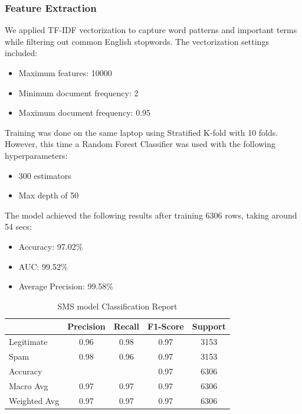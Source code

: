 \documentclass{article}
\begin{document}
\subsubsection*{Feature Extraction}

We applied TF-IDF vectorization to capture word patterns and important terms while filtering out common English stopwords. The vectorization settings included:
\begin{itemize}
    \item Maximum features: 10000
    \item Minimum document frequency: 2
    \item Maximum document frequency: 0.95
\end{itemize}

\noindent
Training was done on the same laptop using Stratified K-fold with 10 folds. However, this time a Random Forest Classifier was used with the following hyperparameters:

\begin{itemize}
    \item 300 estimators
    \item Max depth of 50
\end{itemize}

\noindent
The model achieved the following results after training 6306 rows, taking around 54 secs:

\begin{itemize}
    \item Accuracy: 97.02\%
    \item AUC: 99.52\%
    \item Average Precision: 99.58\%
\end{itemize}

\begin{table}[htbp]
    \centering
    \caption{SMS model Classification Report}
    \begin{tabular}{l c c c c}
    \toprule
     & Precision & Recall & F1-Score & Support \\
    \midrule
    Legitimate & 0.96 & 0.98 & 0.97 & 3153 \\
    Spam & 0.98 & 0.96 & 0.97 & 3153 \\
    \midrule
    Accuracy & & & 0.97 & 6306 \\
    Macro Avg & 0.97 & 0.97 & 0.97 & 6306 \\
    Weighted Avg & 0.97 & 0.97 & 0.97 & 6306 \\
    \bottomrule
    \end{tabular}
    \label{tab:classification_report_2}
\end{table}
\end{document}
